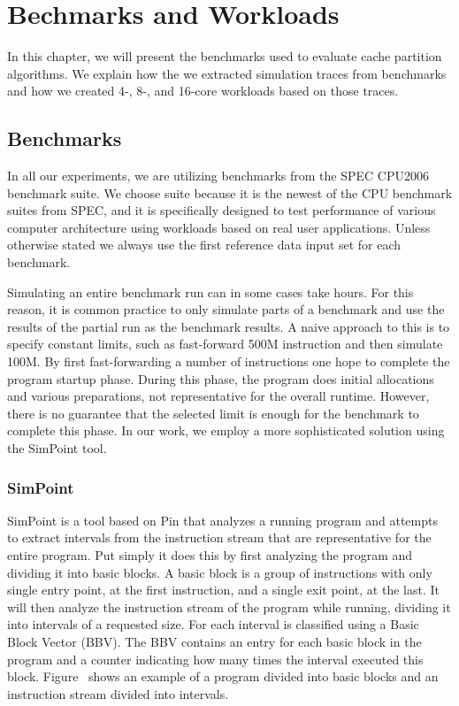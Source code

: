 
\chapter{Bechmarks and Workloads}

In this chapter, we will present the benchmarks used to evaluate cache partition algorithms.
We explain how the we extracted simulation traces from benchmarks and how we created 4-, 8-, and 16-core workloads based on those traces.

\section{Benchmarks}

In all our experiments, we are utilizing benchmarks from the SPEC CPU2006 benchmark suite. 
We choose suite because it is the newest of the CPU benchmark suites from SPEC, and it is specifically designed to test performance of various computer architecture using workloads based on real user applications.
Unless otherwise stated we always use the first reference data input set for each benchmark.

Simulating an entire benchmark run can in some cases take hours.
For this reason, it is common practice to only simulate parts of a benchmark and use the results of the partial run as the benchmark results.
A naive approach to this is to specify constant limits, such as fast-forward 500M instruction and then simulate 100M. 
By first fast-forwarding a number of instructions one hope to complete the program startup phase.
During this phase, the program does initial allocations and various preparations, not representative for the overall runtime.
However, there is no guarantee that the selected limit is enough for the benchmark to complete this phase.
In our work, we employ a more sophisticated solution using the SimPoint tool.

\subsection{SimPoint} 
SimPoint is a tool based on Pin that analyzes a running program and attempts to extract intervals from the instruction stream that are representative for the entire program.
Put simply it does this by first analyzing the program and dividing it into basic blocks.
A basic block is a group of instructions with only single entry point, at the first instruction, and a single exit point, at the last.
It will then analyze the instruction stream of the program while running, dividing it into intervals of a requested size. 
For each interval is classified using a Basic Block Vector (BBV).
The BBV contains an entry for each basic block in the program and a counter indicating how many times the interval executed this block.
Figure~ shows an example of a program divided into basic blocks and an instruction stream divided into intervals.

